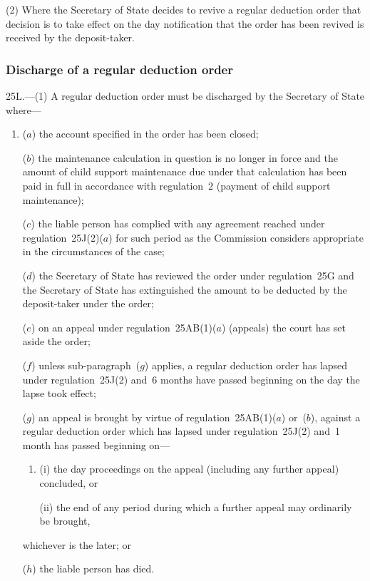 \documentclass[12pt,a4paper]{article}
\begin{document}
(2) Where the 
Secretary of State  %
decides to revive a regular deduction order that decision is to take effect on the day notification that the order has been revived is received by the deposit-taker.


\subsubsection[25L. Discharge of a regular deduction order]{Discharge of a regular deduction order}

25L.---(1)  A regular deduction order must be discharged by the 
Secretary of State  %
where—
\begin{enumerate}\item[]
($a$) the account specified in the order has been closed;

($b$) the maintenance calculation in question is no longer in force and the amount of child support maintenance due under that calculation has been paid in full in accordance with regulation~2 (payment of child support maintenance);

($c$) the liable person has complied with any agreement reached under regulation~25J(2)($a$)  for such period as the Commission considers appropriate in the circumstances of the case;

($d$) the 
Secretary of State  %
has reviewed the order under regulation~25G and 
the Secretary of State  %
has extinguished the amount to be deducted by the deposit-taker under the order;

($e$) on an appeal under regulation~25AB(1)($a$)  (appeals) the court has set aside the order;

($f$) unless sub-paragraph~($g$)  applies, a regular deduction order has lapsed under regulation~25J(2) and~6 months have passed beginning on the day the lapse took effect;

\begin{sloppypar}
($g$) an appeal is brought by virtue of regulation~25AB(1)($a$)  or~($b$), against a regular deduction order which has lapsed under regulation~25J(2) and~1 month has passed beginning on—
\end{sloppypar}
\begin{enumerate}\item[]
(i) the day proceedings on the appeal (including any further appeal) concluded, or

(ii) the end of any period during which a further appeal may ordinarily be brought,
\end{enumerate}
whichever is the later; or

($h$) the liable person has died.
\end{enumerate}
\end{document}
